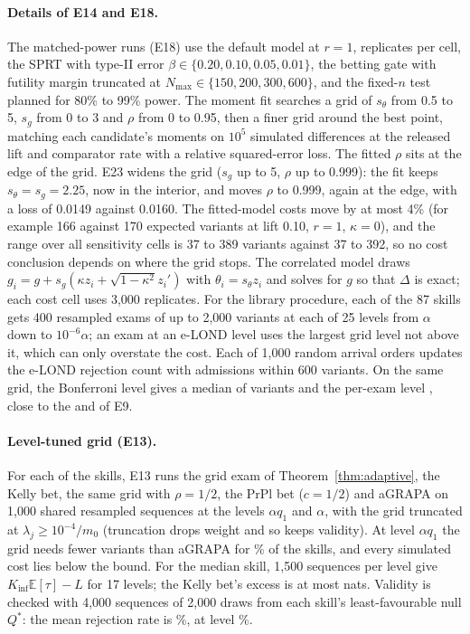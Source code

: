 \paragraph{Details of E14 and E18.} The matched-power runs (E18) use the default model at $r=1$, \PRepsPower{} replicates per cell, the SPRT with type-II error $\beta\in\{0.20,0.10,0.05,0.01\}$, the betting gate with futility margin truncated at $N_{\max}\in\{150,200,300,600\}$, and the fixed-$n$ test planned for 80\% to 99\% power. The moment fit searches a grid of $s_\theta$ from 0.5 to 5, $s_g$ from 0 to 3 and $\rho$ from 0 to 0.95, then a finer grid around the best point, matching each candidate's moments on $10^5$ simulated differences at the released lift and comparator rate with a relative squared-error loss. The fitted $\rho$ sits at the edge of the grid. E23 widens the grid ($s_g$ up to 5, $\rho$ up to 0.999): the fit keeps $s_\theta=s_g=2.25$, now in the interior, and moves $\rho$ to 0.999, again at the edge, with a loss of 0.0149 against 0.0160. The fitted-model costs move by at most 4\% (for example 166 against 170 expected variants at lift 0.10, $r=1$, $\kappa=0$), and the range over all sensitivity cells is 37 to 389 variants against 37 to 392, so no cost conclusion depends on where the grid stops. The correlated model draws $g_i=g+s_g(\kappa z_i+\sqrt{1-\kappa^2}z_i')$ with $\theta_i=s_\theta z_i$ and solves for $g$ so that $\Delta$ is exact; each cost cell uses 3{,}000 replicates. For the library procedure, each of the 87 skills gets 400 resampled exams of up to 2{,}000 variants at each of 25 levels from $\alpha$ down to $10^{-6}\alpha$; an exam at an e-LOND level uses the largest grid level not above it, which can only overstate the cost. Each of 1{,}000 random arrival orders updates the e-LOND rejection count with admissions within 600 variants. On the same grid, the Bonferroni level gives a median of \NRvLibBonf{} variants and the per-exam level \NRvLibPerExam, close to the \NSbMedNBonf{} and \NSbMedNAlpha{} of E9.

\paragraph{Level-tuned grid (E13).} For each of the \NThHelpful{} skills, E13 runs the grid exam of Theorem~\ref{thm:adaptive}, the Kelly bet, the same grid with $\rho=1/2$, the PrPl bet ($c=1/2$) and aGRAPA on 1{,}000 shared resampled sequences at the levels $\alpha q_1$ and $\alpha$, with the grid truncated at $\lambda_j\ge10^{-4}/m_0$ (truncation drops weight and so keeps validity). At level $\alpha q_1$ the grid needs fewer variants than aGRAPA for \NAgGridBeatsAgrapa\% of the skills, and every simulated cost lies below the bound. For the median skill, 1{,}500 sequences per level give $K_{\inf}\mathbb E[\tau]-L$ for 17 levels; the Kelly bet's excess is at most \NAgKellyExMax{} nats. Validity is checked with 4{,}000 sequences of 2{,}000 draws from each skill's least-favourable null $Q^*$: the mean rejection rate is \NAgMeanReject\%, at level \NAgLevelQone\%.

